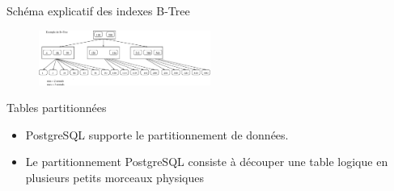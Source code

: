
\begin{frame}[fragile]{Schéma explicatif des indexes B-Tree}

\begin{figure}
\begin{center}
\includegraphics[angle=0, width=0.5\textwidth]{images/b_tree.eps}
\end{center}
\end{figure}

\end{frame}


\begin{frame}[fragile]{Tables partitionnées}

   \begin{itemize}
      \item PostgreSQL supporte le partitionnement de données.
      \item Le partitionnement PostgreSQL consiste à découper une table logique en plusieurs petits morceaux physiques

   \end{itemize}

\begin{toile}
\end{toile}

\end{frame}


